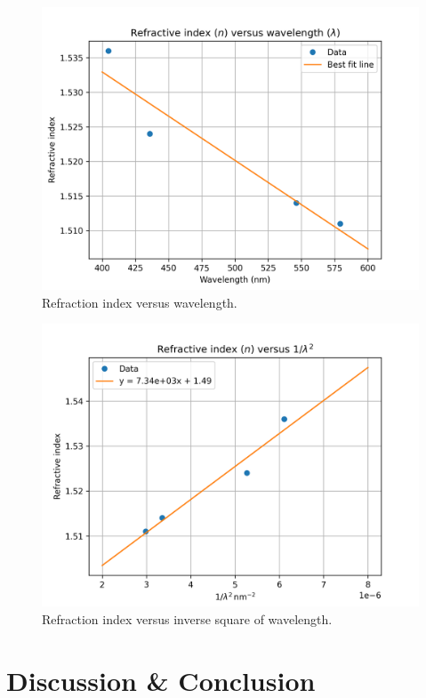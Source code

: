 \documentclass[10pt]{article}
\begin{document}
\begin{figure}[ht]
    \centering
    \includegraphics[scale=0.7]{figures/f2.png}
    \caption{Refraction index versus wavelength.}
    \label{fig:2}
\end{figure}

\begin{figure}[ht]
    \centering
    \includegraphics[scale=0.7]{figures/f3.png}
    \caption{Refraction index versus inverse square of wavelength.}
    \label{fig:3}
\end{figure}

\FloatBarrier %
 
\section{Discussion \& Conclusion}
\end{document}
